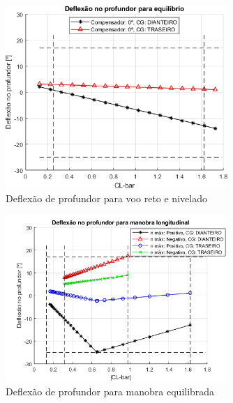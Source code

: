 \begin{figure}[H]
\centering
\includegraphics[width=0.75\textwidth]{images/parte3/De_equi_c20.png}
\caption[Deflexão de profundor para voo reto e nivelado]{Deflexão de profundor para voo reto e nivelado}
\label{fig:def_voo1g}
\end{figure}

\begin{figure}[H]
\centering
\includegraphics[width=0.75\textwidth]{images/parte3/De_man_c20.png}
\caption[Deflexão de profundor para manobra equilibrada]{Deflexão de profundor para manobra equilibrada}
\label{fig:def_vooNz}
\end{figure}
